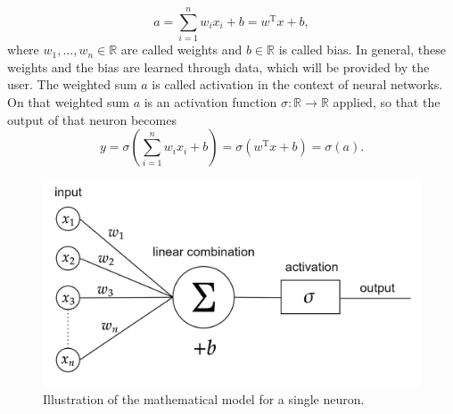\begin{equation*}
    a = \sum^{n}_{i=1} w_i x_i + b = w^{\mathrm{T}} x + b,
\end{equation*}
where $w_1, \ldots, w_n \in \mathbb{R}$ are called weights and $b \in \mathbb{R}$ is called bias. In general, these weights and the bias are learned through data, which will be provided by the user. The weighted sum $a$ is called activation in the context of neural networks. On that weighted sum $a$ is an activation function $\sigma \colon \mathbb{R} \to \mathbb{R}$ applied, so that the output of that neuron becomes
\begin{equation*}
    y = \sigma(\sum^{n}_{i=1} w_i x_i + b) = \sigma(w^{\mathrm{T}} x + b) = \sigma(a).
\end{equation*}

\begin{figure}[H]
    \begin{center}
        \includegraphics[scale=0.3]{img/diagram-20220205_1.png}
    \end{center}
    \caption{Illustration of the mathematical model for a single neuron.}
    \label{fig4}
\end{figure}

